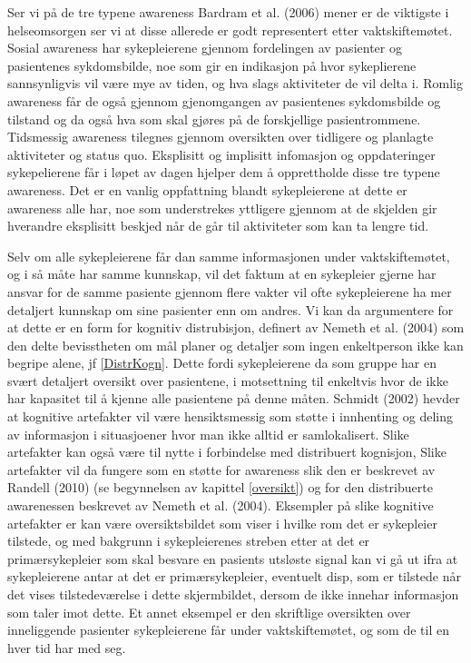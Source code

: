 \noindent
Ser vi på de tre typene awareness Bardram et al. (2006) mener er de viktigste i helseomsorgen ser vi at disse allerede er godt representert etter vaktskiftemøtet. Sosial awareness har sykepleierene gjennom fordelingen av pasienter og pasientenes sykdomsbilde, noe som gir en indikasjon på hvor sykeplierene sannsynligvis vil være mye av tiden, og hva slags aktiviteter de vil delta i. Romlig awareness får de også gjennom gjenomgangen av pasientenes sykdomsbilde og tilstand og da også hva som skal gjøres på de forskjellige pasientrommene. Tidsmessig awareness tilegnes gjennom oversikten over tidligere og planlagte aktiviteter og status quo. Eksplisitt og implisitt infomasjon og oppdateringer sykepelierene får i løpet av dagen hjelper dem å opprettholde disse tre typene awareness. Det er en vanlig oppfattning blandt sykepleierene at dette er awareness alle har, noe som understrekes yttligere gjennom at de skjelden gir hverandre eksplisitt beskjed når de går til aktiviteter som kan ta lengre tid. 

\noindent
Selv om alle sykepleierene får dan samme informasjonen under vaktskiftemøtet, og i så måte har samme kunnskap, vil det faktum at en sykepleier gjerne har ansvar for de samme pasiente gjennom flere vakter vil ofte sykepleierene ha mer detaljert kunnskap om sine pasienter enn om andres. Vi kan da argumentere for at dette er en form for kognitiv distrubisjon, definert av Nemeth et al. (2004) som den delte bevisstheten om mål planer og detaljer som ingen enkeltperson ikke kan begripe alene, jf \ref{DistrKogn}. Dette fordi sykepleierene da som gruppe har en svært detaljert oversikt over pasientene, i motsettning til enkeltvis hvor de ikke har kapasitet til å kjenne alle pasientene på denne måten. 
Schmidt (2002) hevder at kognitive artefakter vil være hensiktsmessig som støtte i innhenting og deling av informasjon i situasjoener hvor man ikke alltid er samlokalisert. Slike artefakter kan også være til nytte i forbindelse med distribuert kognisjon, 
Slike artefakter vil da fungere som en støtte for awareness slik den er beskrevet av Randell (2010) (se begynnelsen av kapittel \ref{oversikt}) og for den distribuerte awarenessen beskrevet av Nemeth et al. (2004).
Eksempler på slike kognitive artefakter er kan være oversiktsbildet som viser i hvilke rom det er sykepleier tilstede, og med bakgrunn i sykepleierenes streben etter at det er primærsykepleier som skal besvare en pasients utsløste signal kan vi gå ut ifra at sykepleierene antar at det er primærsykepleier, eventuelt disp, som er tilstede når det vises tilstedeværelse i dette skjermbildet, dersom de ikke innehar informasjon som taler imot dette. Et annet eksempel er den skriftlige oversikten over inneliggende pasienter sykepleierene får under vaktskiftemøtet, og som de til en hver tid har med seg.

